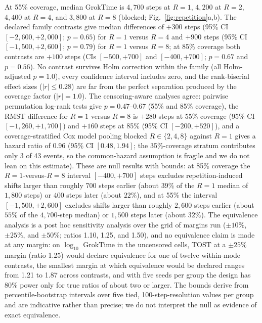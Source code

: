 \documentclass[10pt]{article}
\newcommand{\groktime}{GrokTime}
\begin{document}
At 55\% coverage, median \groktime{} is $4{,}700$ steps at $R=1$, $4{,}200$ at $R=2$, $4{,}400$ at $R=4$, and $3{,}800$ at $R=8$ (blocked; Fig.~\ref{fig:repetition}a,b). The declared family contrasts give median differences of $+300$ steps (95\% CI $[-2{,}600, +2{,}000]$; $p=0.65$) for $R=1$ versus $R=4$ and $+900$ steps (95\% CI $[-1{,}500, +2{,}600]$; $p=0.79$) for $R=1$ versus $R=8$; at 85\% coverage both contrasts are $+100$ steps (CIs $[-500, +700]$ and $[-400, +700]$; $p=0.67$ and $p=0.56$). No contrast survives Holm correction within the family (all Holm-adjusted $p=1.0$), every confidence interval includes zero, and the rank-biserial effect sizes ($|r| \leq 0.28$) are far from the perfect separation produced by the coverage factor ($|r|=1.0$). The censoring-aware analyses agree: pairwise permutation log-rank tests give $p = 0.47$--$0.67$ (55\% and 85\% coverage), the RMST difference for $R=1$ versus $R=8$ is $+280$ steps at 55\% coverage (95\% CI $[-1{,}260, +1{,}700]$) and $+160$ steps at 85\% (95\% CI $[-200, +520]$), and a coverage-stratified Cox model pooling blocked $R \in \{2,4,8\}$ against $R=1$ gives a hazard ratio of $0.96$ (95\% CI $[0.48, 1.94]$; the 35\%-coverage stratum contributes only 3 of 43 events, so the common-hazard assumption is fragile and we do not lean on this estimate). These are null results with bounds: at 85\% coverage the $R=1$-versus-$R=8$ interval $[-400, +700]$ steps excludes repetition-induced shifts larger than roughly $700$ steps earlier (about $39\%$ of the $R=1$ median of $1{,}800$ steps) or $400$ steps later (about $22\%$), and at 55\% the interval $[-1{,}500, +2{,}600]$ excludes shifts larger than roughly $2{,}600$ steps earlier (about $55\%$ of the $4{,}700$-step median) or $1{,}500$ steps later (about $32\%$). The equivalence analysis is a post hoc sensitivity analysis over the grid of margins run ($\pm 10\%$, $\pm 25\%$, and $\pm 50\%$; ratios 1.10, 1.25, and 1.50), and no equivalence claim is made at any margin: on $\log_{10}$ \groktime{} in the uncensored cells, TOST at a $\pm 25\%$ margin (ratio 1.25) would declare equivalence for one of twelve within-mode contrasts, the smallest margin at which equivalence would be declared ranges from 1.21 to 1.87 across contrasts, and with five seeds per group the design has 80\% power only for true ratios of about two or larger. The bounds derive from percentile-bootstrap intervals over five tied, 100-step-resolution values per group and are indicative rather than precise; we do not interpret the null as evidence of exact equivalence.
\end{document}
